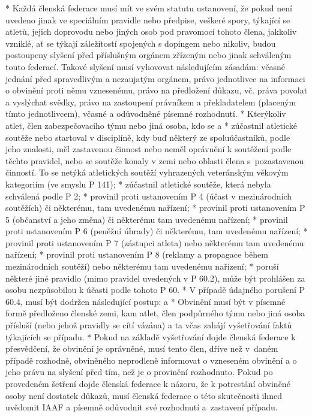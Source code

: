 * Každá členská federace musí mít ve svém statutu ustanovení, že pokud není uvedeno jinak ve speciálním pravidle nebo předpise, veškeré spory, týkající se atletů, jejich doprovodu nebo jiných osob pod pravomocí tohoto člena, jakkoliv vzniklé, ať se týkají záležitostí spojených s dopingem nebo nikoliv, budou postoupeny slyšení před příslušným orgánem zřízeným nebo jinak schváleným touto federací. Takové slyšení musí vyhovovat následujícím zásadám: včasné jednání před spravedlivým a nezaujatým orgánem, právo jednotlivce na informaci o obvinění proti němu vznesenému, právo na předložení důkazu, vč. práva povolat a vyslýchat svědky, právo na zastoupení právníkem a překladatelem (placeným tímto jednotlivcem), včasné a odůvodněné písemné rozhodnutí.
* Kterýkoliv atlet, člen zabezpečovacího týmu nebo jiná osoba, kdo se
  \begitems \style a
  * zúčastnil atletické soutěže nebo startoval v disciplíně, kdy buď některý ze spoluúčastníků, podle jeho znalosti, měl zastavenou činnost nebo neměl oprávnění k soutěžení podle těchto pravidel, nebo se soutěže konaly v zemi nebo oblasti člena s~pozastavenou činností. To se netýká atletických soutěží vyhrazených veteránským věkovým kategoriím (ve smyslu P 141);
  * zúčastnil atletické soutěže, která nebyla schválená podle P 2;
  * provinil proti ustanovením P 4 (účast v mezinárodních soutěžích) či některému, tam uvedenému nařízení;
  * provinil proti ustanovením P 5 (občanství a jeho změna) či některému tam uvedenému nařízení;
  * provinil proti ustanovením P 6 (peněžní úhrady) či některému, tam uvedenému nařízení;
  * provinil proti ustanovením P 7 (zástupci atleta) nebo některému tam uvedenému nařízení;
  * provinil proti ustanovením P 8 (reklamy a propagace během mezinárodních soutěží) nebo některému tam uvedenému nařízení;
  * poruší některé jiné pravidlo (mimo pravidel uvedených v P 60.2),
  \enditems
může být prohlášen za osobu nezpůsobilou k účasti podle tohoto P 60.
* V případě údajného porušení P 60.4, musí být dodržen následující postup:
  \begitems \style a
  * Obvinění musí být v písemné formě předloženo členské zemi, kam atlet, člen podpůrného týmu nebo jiná osoba přísluší (nebo jehož pravidly se cítí vázána) a ta včas zahájí vyšetřování faktů týkajících se případu.
  * Pokud na základě vyšetřování dojde členská federace k přesvědčení, že obvinění je oprávněné, musí tento člen, dříve než v~daném případě rozhodně, obviněného neprodleně informovat o vzneseném obvinění a o jeho právu na slyšení před tím, než je o provinění rozhodnuto. Pokud po provedeném šetření dojde členská federace k názoru, že k potrestání obviněné osoby není dostatek důkazů, musí členská federace o této skutečnosti ihned uvědomit IAAF a písemně odůvodnit své rozhodnutí a~zastavení případu.

